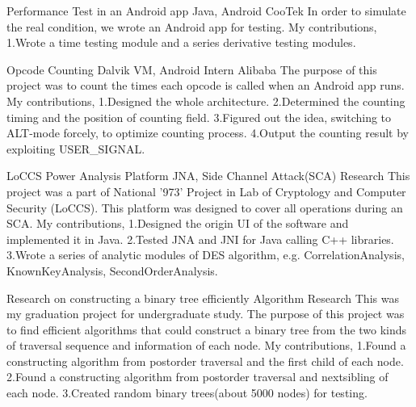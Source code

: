 \documentclass[11pt,a4paper]{moderncv}
\begin{document}
{Performance Test in an Android app}
{Java, Android}{}
{CooTek}
{
In order to simulate the real condition, we wrote an Android app for testing. My contributions,
\newline 1.Wrote a time testing module and a series derivative testing modules.
\newline
}

{Opcode Counting}
{Dalvik VM, Android}
{Intern}
{Alibaba}
{
The purpose of this project was to count the times each opcode is called when an Android app runs. My contributions,
\newline 1.Designed the whole architecture.
\newline 2.Determined the counting timing and the position of counting field.
\newline 3.Figured out the idea, switching to ALT-mode forcely, to optimize counting process.
\newline 4.Output the counting result by exploiting USER\_SIGNAL.
\newline
}

{LoCCS Power Analysis Platform}
{JNA, Side Channel Attack(SCA)}
{Research}{}
{
This project was a part of National ’973’ Project in Lab of Cryptology and Computer Security (LoCCS). This platform was designed to cover all operations during an SCA. My contributions,
\newline 1.Designed the origin UI of the software and implemented it in Java.
\newline 2.Tested JNA and JNI for Java calling C++ libraries.
\newline 3.Wrote a series of analytic modules of DES algorithm, e.g. CorrelationAnalysis, KnownKeyAnalysis, SecondOrderAnalysis.
\newline
}

{Research on constructing a binary tree efficiently}
{Algorithm}
{Research}{}
{
This was my graduation project for undergraduate study. The purpose of this project was to find efficient algorithms that could construct a binary tree from the two kinds of traversal sequence and information of each node. My contributions,
\newline 1.Found a constructing algorithm from postorder traversal and the first child of each node.
\newline 2.Found a constructing algorithm from postorder traversal and nextsibling of each node.
\newline 3.Created random binary trees(about 5000 nodes) for testing.
\newline
}
\end{document}
